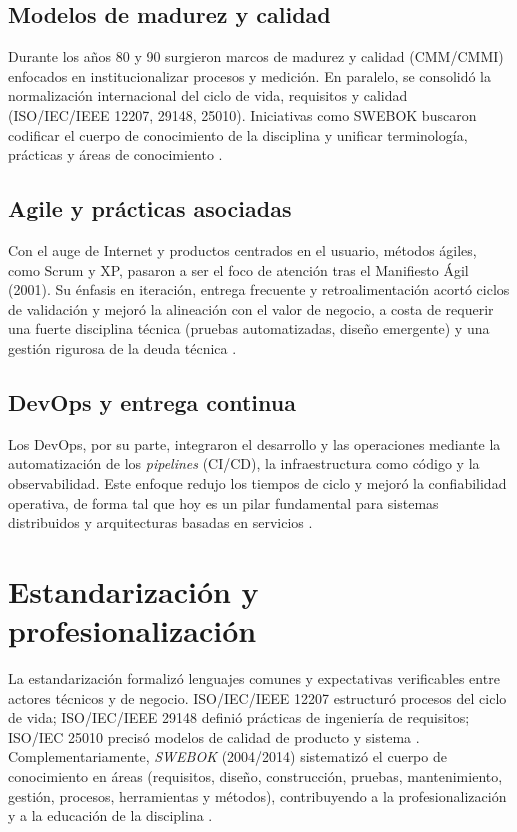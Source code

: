 \documentclass[conference]{IEEEtran}
\begin{document}
\subsection{Modelos de madurez y calidad}
Durante los años 80 y 90 surgieron marcos de madurez y calidad (CMM/CMMI) enfocados en institucionalizar procesos y medición. En paralelo, se consolidó la normalización internacional del ciclo de vida, requisitos y calidad (ISO/IEC/IEEE 12207, 29148, 25010). Iniciativas como SWEBOK buscaron codificar el cuerpo de conocimiento de la disciplina y unificar terminología, prácticas y áreas de conocimiento \cite{booch2018history,swebok2014}.

\subsection{Agile y prácticas asociadas}
Con el auge de Internet y productos centrados en el usuario, métodos ágiles, como Scrum y XP, pasaron a ser el foco de atención tras el Manifiesto Ágil (2001). Su énfasis en iteración, entrega frecuente y retroalimentación acortó ciclos de validación y mejoró la alineación con el valor de negocio, a costa de requerir una fuerte disciplina técnica (pruebas automatizadas, diseño emergente) y una gestión rigurosa de la deuda técnica \cite{agile2001,sommerville10e}.

\subsection{DevOps y entrega continua}
Los DevOps, por su parte, integraron el desarrollo y las operaciones mediante la automatización de los \textit{pipelines} (CI/CD), la infraestructura como código y la observabilidad. Este enfoque redujo los tiempos de ciclo y mejoró la confiabilidad operativa, de forma tal que hoy es un pilar fundamental para sistemas distribuidos y arquitecturas basadas en servicios \cite{pressman2019,booch2018history}.

\section{Estandarización y profesionalización}

La estandarización formalizó lenguajes comunes y expectativas verificables entre actores técnicos y de negocio. ISO/IEC/IEEE 12207 estructuró procesos del ciclo de vida; ISO/IEC/IEEE 29148 definió prácticas de ingeniería de requisitos; ISO/IEC 25010 precisó modelos de calidad de producto y sistema \cite{sommerville10e}. Complementariamente, \emph{SWEBOK} (2004/2014) sistematizó el cuerpo de conocimiento en áreas (requisitos, diseño, construcción, pruebas, mantenimiento, gestión, procesos, herramientas y métodos), contribuyendo a la profesionalización y a la educación de la disciplina \cite{swebok2014,booch2018history}.
\end{document}
